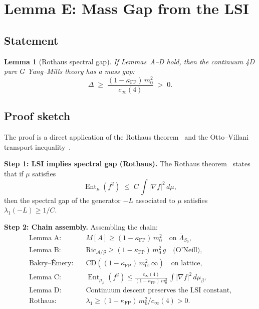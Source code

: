 \documentclass[11pt,a4paper]{amsart}
\newtheorem{lemma}[theorem]{Lemma}
\theoremstyle{definition}
\theoremstyle{remark}
\newcommand{\calA}{\mathcal{A}}
\newcommand{\calG}{\mathcal{G}}
\newcommand{\Ric}{\mathrm{Ric}}
\newcommand{\kFP}{\kappa_{\mathrm{FP}}}
\newcommand{\cinf}{c_{\infty}}
\DeclareMathOperator{\Ent}{Ent}
\begin{document}
\section{Lemma E: Mass Gap from the LSI}\label{sec:lemmaE}

\subsection{Statement}

\begin{lemma}[Rothaus spectral gap]\label{lem:E}
If Lemmas~A--D hold, then the continuum 4D pure $G$ Yang--Mills theory
has a mass gap:
\begin{equation}\label{eq:gap-final}
\Delta \;\geq\; \frac{(1-\kFP)\,m_0^2}{\cinf(4)} \;>\; 0.
\end{equation}
\end{lemma}

\subsection{Proof sketch}

The proof is a direct application of the Rothaus theorem~\cite{Rothaus1981}
and the Otto--Villani transport inequality~\cite{OttoVillani2000}.

\medskip
\noindent
\textbf{Step 1: LSI implies spectral gap (Rothaus).}
The Rothaus theorem~\cite{Rothaus1981} states that if $\mu$ satisfies
\[
\Ent_\mu(f^2) \;\leq\; C\,\int |\nabla f|^2\,d\mu,
\]
then the spectral gap of the generator $-L$ associated to $\mu$ satisfies
$\lambda_1(-L) \geq 1/C$.

\medskip
\noindent
\textbf{Step 2: Chain assembly.}
Assembling the chain:
\begin{align*}
\text{Lemma~A:}\quad &M[A] \geq (1-\kFP)\,m_0^2
\quad \text{on } \overline{\Lambda}_{S_0}, \\
\text{Lemma~B:}\quad &\Ric_{\calA/\calG} \geq (1-\kFP)\,m_0^2\,g
\quad \text{(O'Neill)}, \\
\text{Bakry--\'Emery:}\quad &\mathrm{CD}((1-\kFP)\,m_0^2, \infty)
\quad \text{on lattice}, \\
\text{Lemma~C:}\quad &\Ent_{\mu_\beta}(f^2) \leq
\frac{\cinf(4)}{(1-\kFP)\,m_0^2}\,\int |\nabla f|^2\,d\mu_\beta, \\
\text{Lemma~D:}\quad &\text{Continuum descent preserves the LSI constant,} \\
\text{Rothaus:}\quad &\lambda_1 \geq (1-\kFP)\,m_0^2/\cinf(4) > 0.
\end{align*}
\end{document}

